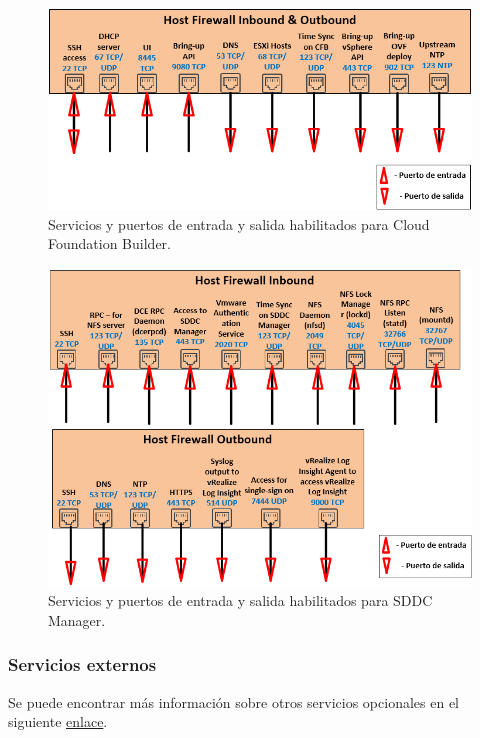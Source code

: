 \begin{figure}[h!]
  \centering
  \includegraphics[width=1\textwidth]{imaxes/conceptosPrevios/firewall_CloudBuilder.png}
  \caption{Servicios y puertos de entrada y salida habilitados para Cloud Foundation Builder.}
  \label{fig:puertosCB}
\end{figure}
\begin{figure}[h!]
  \centering
  \includegraphics[width=1\textwidth]{imaxes/conceptosPrevios/firewall_SDDC.png}
  \caption{Servicios y puertos de entrada y salida habilitados para SDDC Manager.}
  \label{fig:puertosSDDC}
\end{figure}

\FloatBarrier

\subsubsection{Servicios externos}
\label{subsubsec:servExterno}


Se puede encontrar más información sobre otros servicios opcionales en el siguiente \href{https://docs.vmware.com/en/VMware-Cloud-Foundation/3.9/com.vmware.vcf.planprep.doc_39/GUID-F022BD3C-F11C-4EE6-83EA-ABE016E7A9B9.htm}{enlace}.
\FloatBarrier

